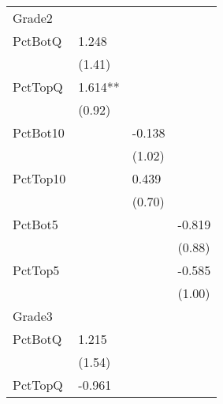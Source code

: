 \begin{table}[htb]
\begin{threeparttable}
\begin{tabular}{l l l l}
      Grade2   &                               &                               &                              \\
      PctBotQ  & 1.248                         &                               &                              \\
               & (1.41)                        &                               &                              \\
      PctTopQ  & 1.614**                       &                               &                              \\
               & (0.92)                        &                               &                              \\
      PctBot10 &                               & -0.138                        &                              \\
               &                               & (1.02)                        &                              \\
      PctTop10 &                               & 0.439                         &                              \\
               &                               & (0.70)                        &                              \\
      PctBot5  &                               &                               & -0.819                       \\
               &                               &                               & (0.88)                       \\
      PctTop5  &                               &                               & -0.585                       \\
               &                               &                               & (1.00)                       \\
      \hline
      Grade3   &                               &                               &                              \\
      PctBotQ  & 1.215                         &                               &                              \\
               & (1.54)                        &                               &                              \\
      PctTopQ  & -0.961                        &                               &                              \\

\end{tabular}
\end{threeparttable}
\end{table}
